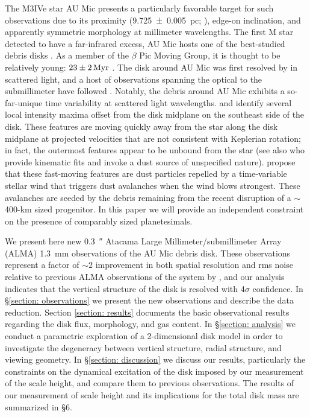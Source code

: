 \documentclass[modern]{aastex62}
\begin{document}
The M3IVe star AU Mic presents a particularly favorable target for such observations due to its proximity (\SI{9.725 \pm 0.005}{pc}; \citealp{gaia16,gaia_DR2}), edge-on inclination, and apparently symmetric morphology at millimeter wavelengths.
The first M star detected to have a far-infrared excess, AU Mic hosts one of the best-studied debris disks \citep{moshir90}. 
As a member of the $\beta$ Pic Moving Group, it is thought to be relatively young: $\SI{23 \pm 2}{Myr}$ \citep{binks&jeffries14,mamajek&bell14,malo14}. 
The disk around AU Mic was first resolved by \cite{kalas04} in scattered light, and a host of observations spanning the optical to the submillimeter have followed \citep{augereau&beust06,macgregor13,matthews15,schneider14,wang15}. 
Notably, the debris around AU Mic exhibits a so-far-unique time variability at scattered light wavelengths.
\cite{boccaletti15} and \cite{boccaletti18} identify several local intensity maxima offset from the disk midplane on the southeast side of the disk. 
These features are moving quickly away from the star along the disk midplane at projected velocities that are not consistent with Keplerian rotation; in fact, the outermost features appear to be unbound from the star (see also \citet{sezestre17} who provide kinematic fits and invoke a dust source of unspecified nature). 
\citet{chiang&fung17} propose that these fast-moving features are dust particles repelled by a time-variable stellar wind that triggers dust avalanches when the wind blows strongest. 
These avalanches are seeded by the debris remaining from the recent disruption of a $\sim$400-km sized progenitor. 
In this paper we will provide an independent constraint on the presence of comparably sized planetesimals.


We present here new \SI{0.3}{\arcsecond} Atacama Large Millimeter/submillimeter Array \newline (ALMA) \SI{1.3}{mm} observations of the AU Mic debris disk. 
These observations represent a factor of $\sim 2$ improvement in both spatial resolution and rms noise relative to previous ALMA observations of the system by \cite{macgregor13}, and our analysis indicates that the vertical structure of the disk is resolved with 4$\sigma$ confidence.
In \S \ref{section: observations} we present the new observations and describe the data reduction.  
Section \ref{section: results} documents the basic observational results regarding the disk flux, morphology, and gas content.  
In \S \ref{section: analysis} we conduct a parametric exploration of a 2-dimensional disk model in order to investigate the degeneracy between vertical structure, radial structure, and viewing geometry.
In \S \ref{section: discussion} we discuss our results, particularly the constraints on the dynamical excitation of the disk imposed by our measurement of the scale height, and compare them to previous observations.
The results of our measurement of scale height and its implications for the total disk mass are summarized in \S 6.
\end{document}
